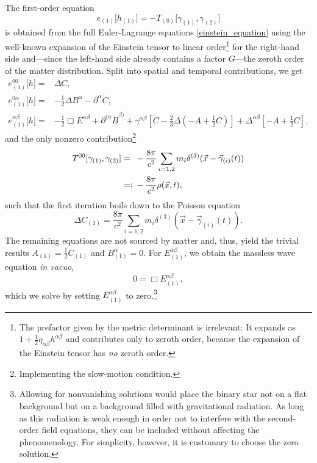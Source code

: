 The first-order equation
\begin{equation}
  e_{(1)}\lbrack h_{(1)}\rbrack = -T_{(0)}\lbrack\gamma_{(1)},\gamma_{(2)}\rbrack
\end{equation}
is obtained from the full Euler-Lagrange equations \eqref{einstein_equation} using the well-known expansion of the Einstein tensor to linear order\footnote{The prefactor given by the metric determinant is irrelevant: It expands as $1 + \frac{1}{2}\eta_{\alpha\beta} h^{\alpha\beta}$ and contributes only to zeroth order, because the expansion of the Einstein tensor has \emph{no} zeroth order.} for the right-hand side and---since the left-hand side already contains a factor $G$---the zeroth order of the matter distribution. Split into spatial and temporal contributions, we get
\begin{equation}\label{three_plus_one_metric_lhs}
  \begin{aligned}
    e^{00}_{(1)}\lbrack h\rbrack = {} & \Delta C, \\
    e^{0\alpha}_{(1)}\lbrack h\rbrack = {} & -\frac{1}{2} \Delta B^\alpha - \partial^\alpha \dot C, \\
    e^{\alpha\beta}_{(1)}\lbrack h\rbrack = {} & -\frac{1}{2} \Box E^{\alpha\beta} + \partial^{(\alpha} \dot B^{\beta)} + \gamma^{\alpha\beta}\left\lbrack \ddot C - \frac{2}{3}\Delta(-A + \frac{1}{2} C)\right\rbrack + \Delta^{\alpha\beta}\left\lbrack -A + \frac{1}{2} C\right\rbrack,
  \end{aligned}
\end{equation}
and the only nonzero contribution\footnote{Implementing the slow-motion condition.}
\begin{equation}
  \begin{aligned}
    T^{00}\lbrack\gamma_{(1)},\gamma_{(2)}\rbrack =\hphantom{\vcentcolon} {} & -\frac{8\pi}{c^2}\sum_{i=1,2}m_i\delta^{(3)}(\vec x-\vec \gamma_{(i)}(t)) \\
    =\vcentcolon {} & -\frac{8\pi}{c^2} \rho(\vec x,t),
  \end{aligned}
\end{equation}
such that the first iteration boils down to the Poisson equation
\begin{equation}\label{poisson_equation}
  \Delta C_{(1)} = \frac{8\pi}{c^2}\sum_{i=1,2}m_i\delta^{(3)}(\vec x-\vec \gamma_{(i)}(t)).
\end{equation}
The remaining equations are not sourced by matter and, thus, yield the trivial results $A_{(1)} = \frac{1}{2} C_{(1)}$ and $B_{(1)}^\alpha = 0$. For $E_{(1)}^{\alpha\beta}$, we obtain the massless wave equation \emph{in vacuo},
\begin{equation}
  0 = \Box E_{(1)}^{\alpha\beta},
\end{equation}
which we solve by setting $E_{(1)}^{\alpha\beta}$ to zero.\footnote{Allowing for nonvanishing solutions would place the binary star not on a flat background but on a background filled with gravitational radiation. As long as this radiation is weak enough in order not to interfere with the second-order field equations, they can be included without affecting the phenomenology. For simplicity, however, it is customary to choose the zero solution.}

